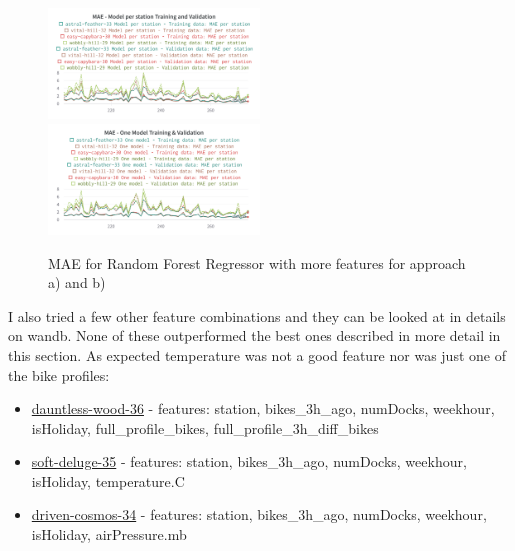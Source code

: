 \documentclass[a4paper]{article}
\begin{document}
    \begin{figure}[h]
        \includegraphics[width=0.5\textwidth]{mae-step3}\hfill
        \includegraphics[width=0.5\textwidth]{mae-one-model-step3}
        \caption{MAE for Random Forest Regressor with more features for approach a) and b)}
        \label{fig:step3-mae}
    \end{figure}

    I also tried a few other feature combinations and they can be looked at in details on wandb. None of these outperformed
    the best ones described in more detail in this section. As expected temperature was not a good feature nor was just one
    of the bike profiles:
    \begin{itemize}
        \item \href{https://wandb.ai/idegen/mlp-2021/runs/2ft9d86n?workspace=user-idegen}{dauntless-wood-36} -
        features: station, bikes\_3h\_ago, numDocks, weekhour, isHoliday, full\_profile\_bikes, full\_profile\_3h\_diff\_bikes
        \item \href{https://wandb.ai/idegen/mlp-2021/runs/1shg15eq?workspace=user-idegen}{soft-deluge-35} -
        features: station, bikes\_3h\_ago, numDocks, weekhour, isHoliday, temperature.C
        \item \href{https://wandb.ai/idegen/mlp-2021/runs/1tsar458?workspace=user-idegen}{driven-cosmos-34} -
        features: station, bikes\_3h\_ago, numDocks, weekhour, isHoliday, airPressure.mb
    \end{itemize}


    \subsubsection*{}
\end{document}
